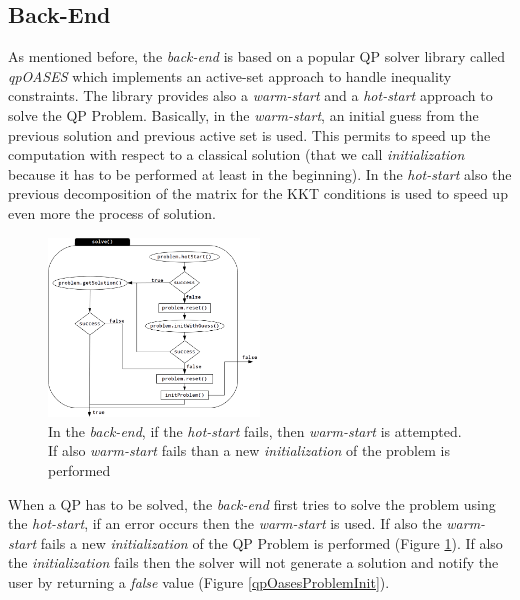 \subsection{Back-End}
As mentioned before, the \emph{back-end} is based on a popular QP solver library called \emph{qpOASES} \cite{ferreau2013} which implements an active-set approach to handle inequality constraints. The library provides also a \emph{warm-start} and a \emph{hot-start} approach to solve the QP Problem. Basically, in the \emph{warm-start}, an initial guess from the previous solution and previous active set is used. This permits to speed up the computation with respect to a classical solution (that we call \emph{initialization} because it has to be performed at least in the beginning).
In the \emph{hot-start} also the previous decomposition of the matrix for the KKT conditions is used to speed up even more the process of solution. 
\begin{figure}[htb] 
\vspace{2 mm}
\centering 
\includegraphics[width=0.5\textwidth]{images/wholebody/QPOasesProblem_solve2.png} 
\caption{In the \emph{back-end}, if the \emph{hot-start} fails, then \emph{warm-start} is attempted. If also \emph{warm-start} fails than a new \emph{initialization} of the problem is performed} 
\label{qpOasesProblemSolve}
\end{figure}

When a QP has to be solved, the \emph{back-end} first tries to solve the problem using the \emph{hot-start}, if an error occurs then the \emph{warm-start} is used. If also the \emph{warm-start} fails a new \emph{initialization} of the QP Problem is performed (Figure \ref{qpOasesProblemSolve}). If also the \emph{initialization} fails then the solver will not generate a solution and notify the user by returning a \emph{false} value (Figure \ref{qpOasesProblemInit}).

